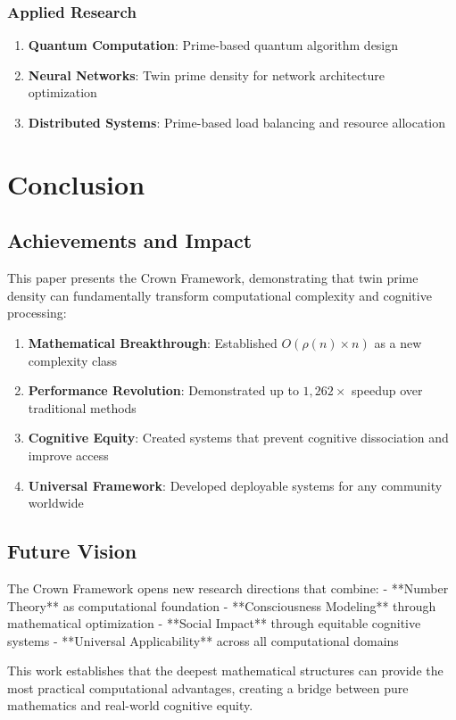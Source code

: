 \documentclass[12pt,a4paper]{article}
\begin{document}
\subsubsection{Applied Research}

\begin{enumerate}
    \item \textbf{Quantum Computation}: Prime-based quantum algorithm design
    \item \textbf{Neural Networks}: Twin prime density for network architecture optimization
    \item \textbf{Distributed Systems}: Prime-based load balancing and resource allocation
\end{enumerate}

\section{Conclusion}

\subsection{Achievements and Impact}

This paper presents the Crown Framework, demonstrating that twin prime density can fundamentally transform computational complexity and cognitive processing:

\begin{enumerate}
    \item \textbf{Mathematical Breakthrough}: Established $O(\rho(n) \times n)$ as a new complexity class
    \item \textbf{Performance Revolution}: Demonstrated up to $1,262\times$ speedup over traditional methods
    \item \textbf{Cognitive Equity}: Created systems that prevent cognitive dissociation and improve access
    \item \textbf{Universal Framework}: Developed deployable systems for any community worldwide
\end{enumerate}

\subsection{Future Vision}

The Crown Framework opens new research directions that combine:
- **Number Theory** as computational foundation
- **Consciousness Modeling** through mathematical optimization  
- **Social Impact** through equitable cognitive systems
- **Universal Applicability** across all computational domains

This work establishes that the deepest mathematical structures can provide the most practical computational advantages, creating a bridge between pure mathematics and real-world cognitive equity.



\end{document}
